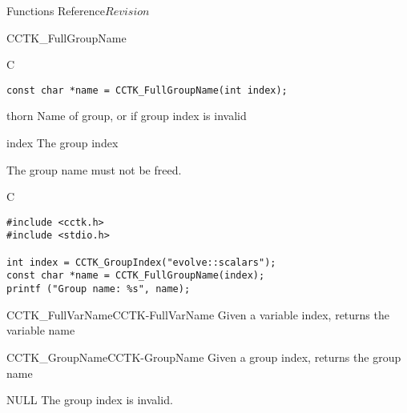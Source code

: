 \begin{cactuspart}{ Functions Reference}{}{$Revision$}
\begin{FunctionDescription}{CCTK\_FullGroupName}
\begin{SynopsisSection}
\begin{Synopsis}{C}
\begin{verbatim}
const char *name = CCTK_FullGroupName(int index);
\end{verbatim}
\end{Synopsis}
\end{SynopsisSection}

\begin{ResultSection}
\begin{Result}{thorn}
Name of group, or  if group index is invalid
\end{Result}
\end{ResultSection}

\begin{ParameterSection}
\begin{Parameter}{index}
The group index
\end{Parameter}
\end{ParameterSection}

\begin{Discussion}
The group name must not be freed.
\end{Discussion}

\begin{ExampleSection}
\begin{Example}{C}
\begin{verbatim}
#include <cctk.h>
#include <stdio.h>

int index = CCTK_GroupIndex("evolve::scalars");
const char *name = CCTK_FullGroupName(index);
printf ("Group name: %s", name);
\end{verbatim}
\end{Example}
\end{ExampleSection}

\begin{SeeAlsoSection}
\begin{SeeAlso2}{CCTK\_FullVarName}{CCTK-FullVarName}
  Given a variable index, returns the variable name
\end{SeeAlso2}
\begin{SeeAlso2}{CCTK\_GroupName}{CCTK-GroupName}
  Given a group index, returns the group name
\end{SeeAlso2}
\end{SeeAlsoSection}

\begin{ErrorSection}
\begin{Error}{NULL}
The group index is invalid.
\end{Error}
\end{ErrorSection}
\end{FunctionDescription}


\end{cactuspart}
